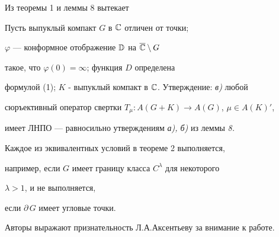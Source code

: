  


Из теоремы 1 и леммы 8 вытекает 


 


\begin{thm} Пусть выпуклый компакт $G$ в $\Bbb C$ отличен от точки; 


$\varphi$ --- конформное отображение $\Bbb D$ на $\overline{\Bbb C}\setminus G$ 


такое, что $\varphi(0)=\infty$; функция $D$ определена 


формулой (1); $K$ - выпуклый компакт в $\Bbb C$. Утверждение: {\em в)} любой 


сюръективный оператор свертки $T_\mu :A(G+K)\to A(G)$, $\mu\in A(K)'$,


имеет ЛНПО --- равносильно утверждениям {\em а), б)} из леммы {\em 8.} 


\end{thm} 


 


\begin{note} Каждое из эквивалентных условий в теореме 2 выполняется, 


например, если $G$ имеет границу класса $C^\lambda$ для некоторого 


$\lambda>1$, и не выполняется, 


если $\partial\, G$ имеет угловые точки. 


\end{note} 


 


Авторы выражают признательность Л.А.Аксентьеву за внимание к работе. 


 


